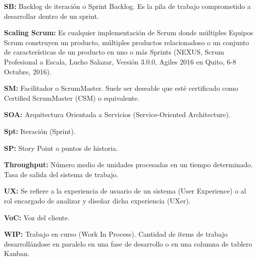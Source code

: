 \begin{description}
  \item {\textbf{SB:} Backlog de iteración o Sprint Backlog. Es la pila de trabajo comprometido a desarrollar dentro de un sprint.}
  
  \item {\textbf{Scaling Scrum:} Es cualquier implementación de Scrum donde múltiples Equipos Scrum construyen un producto, múltiples productos relacionadoso o un conjunto de características de un producto en uno o más Sprints (NEXUS, Scrum Profesional a Escala, Lucho Salazar, Versión 3.0.0,  Agiles 2016 en Quito, 6-8 Octubre, 2016).}
  
  \item {\textbf{SM:} Facilitador o ScrumMaster. Suele ser deseable que esté certificado como Certified ScrumMaster (CSM) o equivalente. }
  
  \item {\textbf{SOA:} Arquitectura Orientada a Servicios (Service-Oriented Architecture).}
  
  \item {\textbf{Spt:} Iteración (Sprint).}
  
  \item {\textbf{SP:} Story Point o puntos de historia.}
  
 \item {\textbf{Throughput:} Número medio de unidades procesadas en un tiempo determinado. Tasa de salida del sistema de trabajo.}
  
  \item {\textbf{UX:} Se refiere a la experiencia de usuario de un sistema (User Experience) o al rol encargado de analizar y diseñar dicha experiencia (UXer).}
  
  \item {\textbf{VoC:} Voz del cliente.}
  
  \item {\textbf{WIP:} Trabajo en curso (Work In Process). Cantidad de ítems de trabajo desarrollándose en paralelo en una fase de desarrollo o en una columna de tablero Kanban.}
  
    
\end{description}
  
